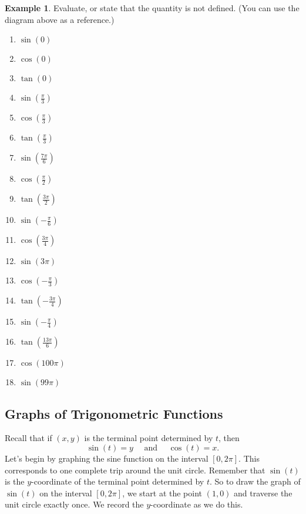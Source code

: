 \documentclass[letterpaper,12pt,oneside]{book}
\theoremstyle{definition}
\newtheorem{example}[theorem]{Example}
\begin{document}
{\begin{example}
Evaluate, or state that the quantity is not defined.  (You can use the diagram above as a reference.)
\begin{multicols}{3}
\begin{enumerate}
\item $\sin(0)$
\item $\cos(0)$
\item $\tan(0)$
\item $\sin(\frac{\pi}{3})$
\item $\cos(\frac{\pi}{3})$
\item $\tan(\frac{\pi}{3})$
\item $\sin(\frac{7\pi}{6})$
\item $\cos(\frac{\pi}{2})$
\item $\tan(\frac{3\pi}{2})$
\item $\sin(-\frac{\pi}{6})$
\item $\cos(\frac{3\pi}{4})$
\item $\sin(3\pi)$
\item $\cos(-\frac{\pi}{3})$
\item $\tan(-\frac{3\pi}{4})$
\item $\sin(-\frac{\pi}{4})$
\item $\tan(\frac{13\pi}{6})$
\item $\cos(100\pi)$
\item $\sin(99\pi)$
\end{enumerate}
\end{multicols}
\end{example}

\newpage

\subsection*{Graphs of Trigonometric Functions}

Recall that if $(x,y)$ is the terminal point determined by $t$, then
\[
\sin(t)=y \ \ \ \ \ \ \mbox{and} \ \ \ \ \ \ \cos(t)=x.
\]
Let's begin by graphing the sine function on the interval $[0,2\pi]$.  This corresponds to one complete trip around the unit circle.  Remember that $\sin(t)$ is the $y$-coordinate of the terminal point determined by $t$.  So to draw the graph of $\sin(t)$ on the interval $[0,2\pi]$, we start at the point $(1,0)$ and traverse the unit circle exactly once.  We record the $y$-coordinate as we do this.

}
\end{document}
